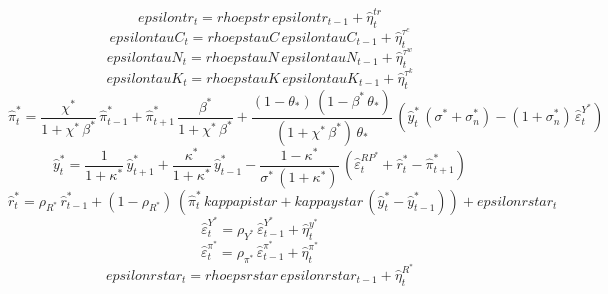 \begin{dmath}
{epsilontr_{t}}={rhoepstr}\, {epsilontr_{t-1}}+{\hat{\eta}^{tr}_{t}}
\end{dmath}
\begin{dmath}
{epsilontauC_{t}}={rhoepstauC}\, {epsilontauC_{t-1}}+{\hat{\eta}^{\tau^c}_{t}}
\end{dmath}
\begin{dmath}
{epsilontauN_{t}}={rhoepstauN}\, {epsilontauN_{t-1}}+{\hat{\eta}^{\tau^w}_{t}}
\end{dmath}
\begin{dmath}
{epsilontauK_{t}}={rhoepstauK}\, {epsilontauK_{t-1}}+{\hat{\eta}^{\tau^k}_{t}}
\end{dmath}
\begin{dmath}
{\hat{\pi}^*_{t}}=\frac{{\chi^*}}{1+{\chi^*}\, {\beta^*}}\, {\hat{\pi}^*_{t-1}}+{\hat{\pi}^*_{t+1}}\, \frac{{\beta^*}}{1+{\chi^*}\, {\beta^*}}+\frac{\left(1-{\theta_*}\right)\, \left(1-{\beta^*}\, {\theta_*}\right)}{\left(1+{\chi^*}\, {\beta^*}\right)\, {\theta_*}}\, \left({\hat{y}^*_{t}}\, \left({\sigma^*}+{\sigma^*_n}\right)-\left(1+{\sigma^*_n}\right)\, {\hat{\varepsilon}^{Y^*}_{t}}\right)
\end{dmath}
\begin{dmath}
{\hat{y}^*_{t}}=\frac{1}{1+{\kappa^*}}\, {\hat{y}^*_{t+1}}+\frac{{\kappa^*}}{1+{\kappa^*}}\, {\hat{y}^*_{t-1}}-\frac{1-{\kappa^*}}{{\sigma^*}\, \left(1+{\kappa^*}\right)}\, \left({\hat{\varepsilon}^{RP^*}_{t}}+{\hat{r}^*_{t}}-{\hat{\pi}^*_{t+1}}\right)
\end{dmath}
\begin{dmath}
{\hat{r}^*_{t}}={\rho_{R^*}}\, {\hat{r}^*_{t-1}}+\left(1-{\rho_{R^*}}\right)\, \left({\hat{\pi}^*_{t}}\, {kappapistar}+{kappaystar}\, \left({\hat{y}^*_{t}}-{\hat{y}^*_{t-1}}\right)\right)+{epsilonrstar_{t}}
\end{dmath}
\begin{dmath}
{\hat{\varepsilon}^{Y^*}_{t}}={\rho_{Y^*}}\, {\hat{\varepsilon}^{Y^*}_{t-1}}+{\hat{\eta}^{y^*}_{t}}
\end{dmath}
\begin{dmath}
{\hat{\varepsilon}^{\pi^*}_{t}}={\rho_{\pi^*}}\, {\hat{\varepsilon}^{\pi^*}_{t-1}}+{\hat{\eta}^{\pi^*}_{t}}
\end{dmath}
\begin{dmath}
{epsilonrstar_{t}}={rhoepsrstar}\, {epsilonrstar_{t-1}}+{\hat{\eta}^{R^*}_{t}}
\end{dmath}
